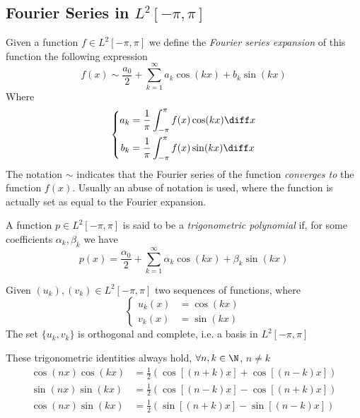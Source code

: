 \documentclass[../mmf.tex]{subfiles}
\begin{document}
\subsection{Fourier Series in $L^2[-\pi,\pi]$}
\begin{dfn}
	Given a function $f\in L^2[-\pi,\pi]$ we define the \textit{Fourier series expansion} of this function the following expression
	\begin{equation}
		f(x)\sim\frac{a_0}{2}+\sum_{k=1}^{\infty}a_k\cos(kx)+b_k\sin(kx)
		\label{eq:fourierseries}
	\end{equation}
	Where
	\begin{equation}
		\left\{\begin{aligned}
				a_k&=\frac{1}{\pi}\int_{-\pi}^{\pi}f(x)\cos(kx)\diff x\\
				b_k&=\frac{1}{\pi}\int_{-\pi}^{\pi}f(x)\sin(kx)\diff x
		\end{aligned}\right.
		\label{eq:fouriercoeff}
	\end{equation}
	The notation $\sim$ indicates that the Fourier series of the function \textit{converges to} the function $f(x)$. Usually an abuse of notation is used, where the function is actually set as equal to the Fourier expansion.
\end{dfn}
\begin{dfn}
	A function $p\in L^2[-\pi,\pi]$ is said to be a \textit{trigonometric polynomial} if, for some coefficients $\alpha_k,\beta_k$ we have
	\begin{equation}
		p(x)=\frac{\alpha_0}{2}+\sum_{k=1}^{\infty}\alpha_k\cos(kx)+\beta_k\sin(kx)
		\label{eq:trigpolyn}
	\end{equation}
\end{dfn}
\begin{thm}
	Given $(u_k),(v_k)\in L^2[-\pi,\pi]$ two sequences of functions, where
	\begin{equation*}
		\left\{\begin{aligned}
				u_k(x)&=\cos(kx)\\
				v_k(x)&=\sin(kx)
		\end{aligned}\right.
	\end{equation*}
	The set $\{u_k,v_k\}$ is orthogonal and complete, i.e. a basis in $L^2[-\pi,\pi]$
\end{thm}
\begin{rmk}
	These trigonometric identities always hold, $\forall n,k\in\N$, $n\ne k$
	\begin{equation}
		\begin{aligned}
			\cos(nx)\cos(kx)&=\frac{1}{2}\left( \cos[(n+k)x]+\cos[(n-k)x] \right)\\
			\sin(nx)\sin(kx)&=\frac{1}{2}\left( \cos[(n-k)x]-\cos[(n+k)x] \right)\\
			\cos(nx)\sin(kx)&=\frac{1}{2}\left( \sin[(n+k)x]-\sin[(n-k)x] \right)
		\end{aligned}
		\label{eq:trigidentities2rmk}
	\end{equation}
\end{rmk}
\end{document}
